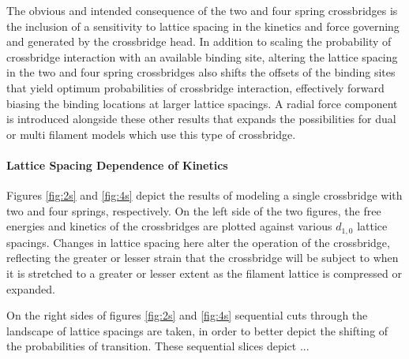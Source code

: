 \documentclass[]{article}
\begin{document}
The obvious and intended consequence of the two and four spring crossbridges is the inclusion of a sensitivity to lattice spacing in the kinetics and force governing and generated by the crossbridge head. 
In addition to scaling the probability of crossbridge interaction with an available binding site, altering the lattice spacing in the two and four spring crossbridges also shifts the offsets of the binding sites that yield optimum probabilities of crossbridge interaction, effectively forward biasing the binding locations at larger lattice spacings.
A radial force component is introduced alongside these other results that expands the possibilities for dual or multi filament models which use this type of crossbridge.

\paragraph{Lattice Spacing Dependence of Kinetics} %
Figures \ref{fig:2s} and \ref{fig:4s} depict the results of modeling a single crossbridge with two and four springs, respectively.
On the left side of the two figures, the free energies and kinetics of the crossbridges are plotted against various $d_{1,0}$ lattice spacings. 
Changes in lattice spacing here alter the operation of the crossbridge, reflecting the greater or lesser strain that the crossbridge will be subject to when it is stretched to a greater or lesser extent as the filament lattice is compressed or expanded.

On the right sides of figures \ref{fig:2s} and \ref{fig:4s} sequential cuts through the landscape of lattice spacings are taken, in order to better depict the shifting of the probabilities of transition.
These sequential slices depict ...

\end{document}
